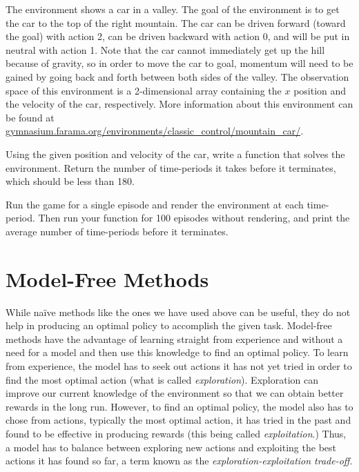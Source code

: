 \begin{problem}
The environment  shows a car in a valley.
The goal of the environment is to get the car to the top of the right mountain.
The car can be driven forward (toward the goal) with action 2, can be driven backward with action 0, and will be put in neutral with action 1.
Note that the car cannot immediately get up the hill because of gravity, so in order to move the car to goal, momentum will need to be gained by going back and forth between both sides of the valley.
The observation space of this environment is a 2-dimensional array containing the $x$ position and the velocity of the car, respectively.
More information about this environment can be found at \url{gymnasium.farama.org/environments/classic_control/mountain_car/}.

Using the given position and velocity of the car, write a function  that solves the  environment.
Return the number of time-periods it takes before it terminates, which should be less than 180.

Run the game for a single episode and render the environment at each time-period.
Then run your function for 100 episodes without rendering, and print the average number of time-periods before it terminates.

\label{prob:car}
\end{problem}

\section*{Model-Free Methods}
While na\"{i}ve methods like the ones we have used above can be useful, they do not help in producing an optimal policy to accomplish the given task.
Model-free methods have the advantage of learning straight from experience and without a need for a model and then use this knowledge to find an optimal policy.
To learn from experience, the model has to seek out actions it has not yet tried in order to find the most optimal action (what is called \emph{exploration}).
Exploration can improve our current knowledge of the environment so that we can obtain better rewards in the long run.
However, to find an optimal policy, the model also has to chose from actions, typically the most optimal action, it has tried in the past and found to be effective in producing rewards (this being called \emph{exploitation}.)
Thus, a model has to balance between exploring new actions and exploiting the best actions it has found so far, a term known as the \emph{exploration-exploitation trade-off}.

